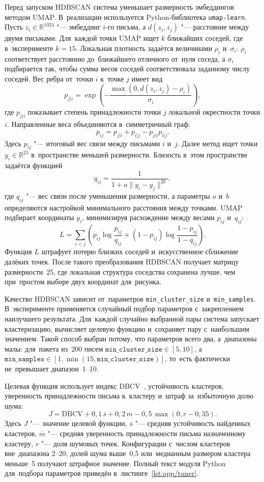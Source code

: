Перед запуском HDBSCAN система уменьшает размерность эмбеддингов методом UMAP.
В~реализации используется Python-библиотека \texttt{umap-learn}. Пусть
\( z_i \in \mathbb{R}^{1024} \) "--- эмбеддинг \(i\)-го письма, а
\( d(z_i,z_j) \) "--- расстояние между двумя письмами. Для~каждой точки UMAP
ищет \( k \) ближайших соседей, где в~эксперименте \( k=15 \). Локальная
плотность задаётся величинами \( \rho_i \) и~\( \sigma_i \): \(\rho_i\)
соответствует расстоянию до~ближайшего отличного от~нуля соседа, а
\(\sigma_i\) подбирается так, чтобы сумма весов соседей соответствовала
заданному числу соседей. Вес ребра от~точки \(i\) к~точке \(j\) имеет вид
\[
    p_{j|i} =
    \exp\left(
        -\frac{\max(0, d(z_i,z_j)-\rho_i)}{\sigma_i}
    \right),
\]
где \( p_{j|i} \) показывает степень принадлежности точки \(j\) локальной
окрестности точки \(i\). Направленные веса объединяются в~симметричный граф:
\[
    p_{ij}=p_{j|i}+p_{i|j}-p_{j|i}p_{i|j}.
\]
Здесь \( p_{ij} \) "--- итоговый вес связи между письмами \(i\) и~\(j\).
Далее метод ищет точки \( y_i \in \mathbb{R}^{25} \) в~пространстве меньшей
размерности. Близость в~этом пространстве задаётся функцией
\[
    q_{ij}=\frac{1}{1+a\lVert y_i-y_j\rVert^{2b}},
\]
где \( q_{ij} \) "--- вес связи после уменьшения размерности, а параметры
\( a \) и~\( b \) определяются настройкой минимального расстояния между точками.
UMAP подбирает координаты \( y_i \), минимизируя расхождение между весами
\( p_{ij} \) и~\( q_{ij} \):
\[
    L=\sum_{i<j}
    \left(
        p_{ij}\log\frac{p_{ij}}{q_{ij}}+
        (1-p_{ij})\log\frac{1-p_{ij}}{1-q_{ij}}
    \right).
\]
Функция \( L \) штрафует потерю близких соседей и~искусственное сближение
далёких точек. После такого преобразования HDBSCAN получает матрицу
размерности~25, где локальная структура соседства сохранена лучше, чем
при~простом выборе двух координат для~рисунка.

Качество HDBSCAN зависит от~параметров \texttt{min\_cluster\_size}
и~\texttt{min\_samples}. В~эксперименте применяется случайный подбор параметров
с~закреплением наилучшего результата. Для~каждой случайно выбранной пары
система запускает кластеризацию, вычисляет целевую функцию и~сохраняет пару
с~наибольшим значением. Такой способ выбран потому, что параметров всего два,
а~диапазоны малы: для~пакета из~200 писем
\(\texttt{min\_cluster\_size}\in[5,10]\), а
\(\texttt{min\_samples}\in[1,\min(15,\texttt{min\_cluster\_size})]\), то~есть
фактически не~превышает диапазон~1--10.

Целевая функция использует индекс DBCV~\cite{Moulavi2014DBCV}, устойчивость
кластеров, уверенность принадлежности письма к~кластеру и~штраф за~избыточную
долю шума:
\[
    J =
    \mathrm{DBCV}
    + 0{,}1\,\overline{s}
    + 0{,}2\,\overline{m}
    - 0{,}5\,\max(0, r-0{,}35).
\]
Здесь \( J \) "--- значение целевой функции, \( \overline{s} \) "--- средняя
устойчивость найденных кластеров, \( \overline{m} \) "--- средняя уверенность
принадлежности письма назначенному кластеру, \( r \) "--- доля шумовых точек.
Конфигурации с~числом кластеров вне~диапазона 2--20, долей шума выше~0{,}5
или~медианным размером кластера меньше~5 получают штрафное значение. Полный
текст модуля Python для~подбора параметров приведён
в~листинге~\ref{lst:app/tuner}.

